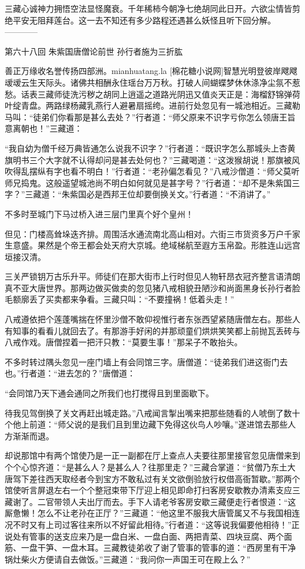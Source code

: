 \documentclass[12pt,UTF8]{ctexbook}
\begin{document}
三藏心诚神力拥悟空法显怪魔衰。千年稀柿今朝净七绝胡同此日开。六欲尘情皆剪绝平安无阻拜莲台。这一去不知还有多少路程还遇甚么妖怪且听下回分解。
------------

第六十八回 朱紫国唐僧论前世 孙行者施为三折肱

善正万缘收名誉传扬四部洲。mianhuatang.la [棉花糖小说网]智慧光明登彼岸飕飕叆叆云生天际头。诸佛共相酬永住瑶台万万秋。打破人间蝴蝶梦休休涤净尘氛不惹愁。话表三藏师徒洗污秽之胡同上逍遥之道路光阴迅又值炎天正是：海榴舒锦弹荷叶绽青盘。两路绿杨藏乳燕行人避暑扇摇绔。进前行处忽见有一城池相近。三藏勒马叫：“徒弟们你看那是甚么去处？”行者道：“师父原来不识字亏你怎么领唐王旨意离朝也！”三藏道：

“我自幼为僧千经万典皆通怎么说我不识字？”行者道：“既识字怎么那城头上杏黄旗明书三个大字就不认得却问是甚去处何也？”三藏喝道：“这泼猴胡说！那旗被风吹得乱摆纵有字也看不明白！”行者道：“老孙偏怎看见？”八戒沙僧道：“师父莫听师兄捣鬼。这般遥望城池尚不明白如何就见是甚字号？”行者道：“却不是朱紫国三字？”三藏道：“朱紫国必是西邦王位却要倒换关文。”行者道：“不消讲了。”

不多时至城门下马过桥入进三层门里真个好个皇州！

但见：门楼高耸垛迭齐排。周围活水通流南北高山相对。六街三市货资多万户千家生意盛。果然是个帝王都会处天府大京城。绝域梯航至遐方玉帛盈。形胜连山远宫垣接汉清。

三关严锁钥万古乐升平。师徒们在那大街市上行时但见人物轩昂衣冠齐整言语清朗真不亚大唐世界。那两边做买做卖的忽见猪八戒相貌丑陋沙和尚面黑身长孙行者脸毛额廓丢了买卖都来争看。三藏只叫：“不要撞祸！低着头走！”

八戒遵依把个莲蓬嘴揣在怀里沙僧不敢仰视惟行者东张西望紧随唐僧左右。那些人有知事的看看儿就回去了。有那游手好闲的并那顽童们烘烘笑笑都上前抛瓦丢砖与八戒作戏。唐僧捏着一把汗只教：“莫要生事！”那呆子不敢抬头。

不多时转过隅头忽见一座门墙上有会同馆三字。唐僧道：“徒弟我们进这衙门去也。”行者道：“进去怎的？”唐僧道：

“会同馆乃天下通会通同之所我们也打搅得且到里面歇下。

待我见驾倒换了关文再赶出城走路。”八戒闻言掣出嘴来把那些随看的人唬倒了数十个他上前道：“师父说的是我们且到里边藏下免得这伙鸟人吵嚷。”遂进馆去那些人方渐渐而退。

却说那馆中有两个馆使乃是一正一副都在厅上查点人夫要往那里接官忽见唐僧来到个个心惊齐道：“是甚么人？是甚么人？往那里走？”三藏合掌道：“贫僧乃东土大唐驾下差往西天取经者今到宝方不敢私过有关文欲倒验放行权借高衙暂歇。”那两个馆使听言屏退左右一个个整冠束带下厅迎上相见即命打扫客房安歇教办清素支应三藏谢了。二官带领人夫出厅而去。手下人请老爷客房安歇三藏便走行者恨道：“这厮惫懒！怎么不让老孙在正厅？”三藏道：“他这里不服我大唐管属又不与我国相连况不时又有上司过客往来所以不好留此相待。”行者道：“这等说我偏要他相待！”正说处有管事的送支应来乃是一盘白米、一盘白面、两把青菜、四块豆腐、两个面筋、一盘干笋、一盘木耳。三藏教徒弟收了谢了管事的管事的道：“西房里有干净锅灶柴火方便请自去做饭。”三藏道：“我问你一声国王可在殿上么？”
\end{document}
